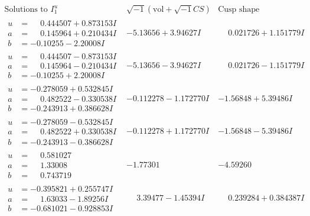 \documentclass[1p]{elsarticle_modified}
\theoremstyle{definition}
\newcommand{\I}{\sqrt{-1}}
\begin{document}
$$\begin{array}{c|c|c}  
\text{Solutions to }I^u_{1}& \I (\text{vol} + \sqrt{-1}CS) & \text{Cusp shape}\\
 \hline 
\begin{aligned}
u &= \phantom{-}0.444507 + 0.873153 I \\
a &= \phantom{-}0.145964 + 0.210434 I \\
b &= -0.10255 - 2.20008 I\end{aligned}
 & -5.13656 + 3.94627 I & \phantom{-}0.021726 + 1.151779 I \\ \hline\begin{aligned}
u &= \phantom{-}0.444507 - 0.873153 I \\
a &= \phantom{-}0.145964 - 0.210434 I \\
b &= -0.10255 + 2.20008 I\end{aligned}
 & -5.13656 - 3.94627 I & \phantom{-}0.021726 - 1.151779 I \\ \hline\begin{aligned}
u &= -0.278059 + 0.532845 I \\
a &= \phantom{-}0.482522 - 0.330538 I \\
b &= -0.243913 + 0.386628 I\end{aligned}
 & -0.112278 - 1.172770 I & -1.56848 + 5.39486 I \\ \hline\begin{aligned}
u &= -0.278059 - 0.532845 I \\
a &= \phantom{-}0.482522 + 0.330538 I \\
b &= -0.243913 - 0.386628 I\end{aligned}
 & -0.112278 + 1.172770 I & -1.56848 - 5.39486 I \\ \hline\begin{aligned}
u &= \phantom{-}0.581027\phantom{ +0.000000I} \\
a &= \phantom{-}1.33008\phantom{ +0.000000I} \\
b &= \phantom{-}0.743719\phantom{ +0.000000I}\end{aligned}
 & -1.77301\phantom{ +0.000000I} & -4.59260\phantom{ +0.000000I} \\ \hline\begin{aligned}
u &= -0.395821 + 0.255747 I \\
a &= \phantom{-}1.63033 - 1.89256 I \\
b &= -0.681021 - 0.928853 I\end{aligned}
 & \phantom{-}3.39477 - 1.45394 I & \phantom{-}0.239284 + 0.384387 I \\ \hline\begin{aligned}

\end{aligned}
\end{array}$$
\end{document}

